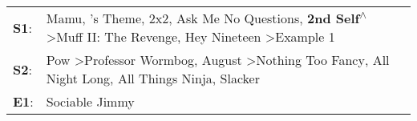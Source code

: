 \begin{supertabular}{p{0.03\textwidth}p{0.92\textwidth}}
 \textbf{S1}:  &  Mamu\textsuperscript{}, 's Theme\textsuperscript{}, \enspace 2x2\textsuperscript{}, \enspace Ask Me No Questions\textsuperscript{}, \enspace \textbf{2nd Self\textsuperscript{$\wedge$}} \textgreater \enspace Muff II: The Revenge\textsuperscript{}, \enspace Hey Nineteen\textsuperscript{} \textgreater \enspace Example 1\textsuperscript{}  \enspace  \\
 \textbf{S2}:  &                                                     Pow\textsuperscript{} \textgreater \enspace Professor Wormbog\textsuperscript{}, \enspace August\textsuperscript{} \textgreater \enspace Nothing Too Fancy\textsuperscript{}, \enspace All Night Long\textsuperscript{}, \enspace All Things Ninja\textsuperscript{}, \enspace Slacker\textsuperscript{}  \enspace  \\
 \textbf{E1}:  &                                                                                                                                                                                                                                                                                                                             Sociable Jimmy\textsuperscript{}  \enspace  \\
\end{supertabular}
